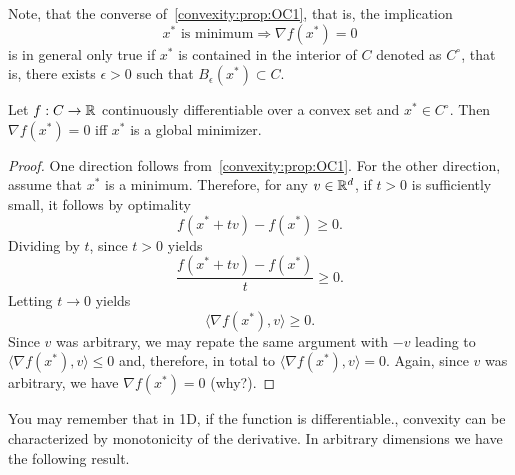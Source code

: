 Note, that the converse of~\cref{convexity:prop:OC1}, that is, the implication
\begin{equation}
    \text{$x^*$ is minimum} \Rightarrow \nabla f(x^*) = 0
\end{equation}
is in general only true if $x^*$ is contained in the interior of $C$ denoted as $C^\circ$, that is, there exists $\epsilon>0$ such that $B_\epsilon(x^*)\subset C$.

\begin{theorem}
    Let $f:C\rightarrow \mathbb{R}$ continuously differentiable over a convex set and $x^*\in C^\circ$. Then $\nabla f(x^*)=0$ iff $x^*$ is a global minimizer.
\end{theorem}
\begin{proof}
    One direction follows from~\cref{convexity:prop:OC1}. For the other direction, assume that $x^*$ is a minimum. Therefore, for any $v\in\mathbb{R}^d$, if $t>0$ is sufficiently small, it follows by optimality
    \begin{equation}
        f(x^*+tv) - f(x^*)\geq 0.
    \end{equation}
    Dividing by $t$, since $t>0$ yields
    \begin{equation}
        \frac{f(x^*+tv) - f(x^*)}{t}\geq 0.
    \end{equation}
    Letting $t\rightarrow 0$ yields 
    \begin{equation}
        \langle\nabla f(x^*), v\rangle\geq 0.
    \end{equation}
    Since $v$ was arbitrary, we may repate the same argument with $-v$ leading to $\langle\nabla f(x^*), v\rangle\leq 0$ and, therefore, in total to $\langle\nabla f(x^*), v\rangle = 0$. Again, since $v$ was arbitrary, we have $\nabla f(x^*)=0$ (why?).
\end{proof}

You may remember that in 1D, if the function is differentiable., convexity can be characterized by monotonicity of the derivative. In arbitrary dimensions we have the following result.


